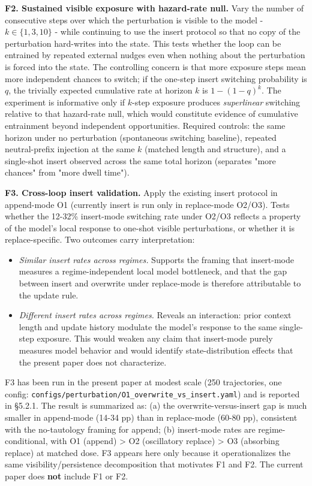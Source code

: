 \documentclass{article}
\theoremstyle{plain}
\theoremstyle{definition}
\begin{document}
\textbf{F2. Sustained visible exposure with hazard-rate null.} Vary the number of consecutive steps over which the perturbation is visible to the model - \(k\in\{1,3,10\}\) - while continuing to use the insert protocol so that no copy of the perturbation hard-writes into the state. This tests whether the loop can be entrained by repeated external nudges even when nothing about the perturbation is forced into the state. The controlling concern is that more exposure steps mean more independent chances to switch; if the one-step insert switching probability is \(q\), the trivially expected cumulative rate at horizon \(k\) is \(1-(1-q)^k\). The experiment is informative only if \(k\)-step exposure produces \textit{superlinear} switching relative to that hazard-rate null, which would constitute evidence of cumulative entrainment beyond independent opportunities. Required controls: the same horizon under no perturbation (spontaneous switching baseline), repeated neutral-prefix injection at the same \(k\) (matched length and structure), and a single-shot insert observed across the same total horizon (separates "more chances" from "more dwell time").

\textbf{F3. Cross-loop insert validation.} Apply the existing insert protocol in append-mode O1 (currently insert is run only in replace-mode O2/O3). Tests whether the 12-32\% insert-mode switching rate under O2/O3 reflects a property of the model's local response to one-shot visible perturbations, or whether it is replace-specific. Two outcomes carry interpretation:

\begin{itemize}
  \item \textit{Similar insert rates across regimes.} Supports the framing that insert-mode measures a regime-independent local model bottleneck, and that the gap between insert and overwrite under replace-mode is therefore attributable to the update rule.
  \item \textit{Different insert rates across regimes.} Reveals an interaction: prior context length and update history modulate the model's response to the same single-step exposure. This would weaken any claim that insert-mode purely measures model behavior and would identify state-distribution effects that the present paper does not characterize.
\end{itemize}

F3 has been run in the present paper at modest scale (250 trajectories, one config: \texttt{configs/perturbation/O1\_overwrite\_vs\_insert.yaml}) and is reported in §5.2.1. The result is summarized as: (a) the overwrite-versus-insert gap is much smaller in append-mode (14-34 pp) than in replace-mode (60-80 pp), consistent with the no-tautology framing for append; (b) insert-mode rates are regime-conditional, with O1 (append) > O2 (oscillatory replace) > O3 (absorbing replace) at matched dose. F3 appears here only because it operationalizes the same visibility/persistence decomposition that motivates F1 and F2. The current paper does \textbf{not} include F1 or F2.
\end{document}

